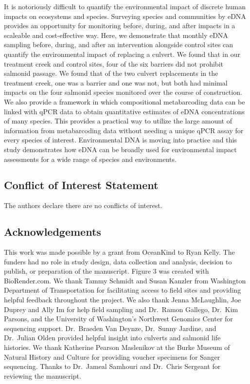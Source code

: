 \documentclass[
]{article}
\begin{document}
It is notoriously difficult to quantify the environmental impact of
discrete human impacts on ecosystems and species. Surveying species and
communities by eDNA provides an opportunity for monitoring before,
during, and after impacts in a scaleable and cost-effective way. Here,
we demonstrate that monthly eDNA sampling before, during, and after an
intervention alongside control sites can quantify the environmental
impact of replacing a culvert. We found that in our treatment creek and
control sites, four of the six barriers did not prohibit salmonid
passage. We found that of the two culvert replacements in the treatment
creek, one was a barrier and one was not, but both had minimal impacts
on the four salmonid species monitored over the course of construction.
We also provide a framework in which compositional metabarcoding data
can be linked with qPCR data to obtain quantitative estimates of eDNA
concentrations of many species. This provides a practical way to utilize
the large amount of information from metabarcoding data without needing
a unique qPCR assay for every species of interest. Environmental DNA is
moving into practice and this study demonstrates how eDNA can be broadly
used for environmental impact assessments for a wide range of species
and environments.

\hypertarget{conflict-of-interest-statement}{%
\subsection{Conflict of Interest
Statement}\label{conflict-of-interest-statement}}

The authors declare there are no conflicts of interest.

\hypertarget{acknowledgements}{%
\subsection{Acknowledgements}\label{acknowledgements}}

This work was made possible by a grant from OceanKind to Ryan Kelly. The
funders had no role in study design, data collection and analysis,
decision to publish, or preparation of the manuscript. Figure 3 was
created with BioRender.com. We thank Tammy Schmidt and Susan Kanzler
from Washington Department of Transportation for facilitating access to
field sites and providing helpful feedback throughout the project. We
also thank Jenna McLaughlin, Joe Duprey and Ally Im for help field
sampling and Dr.~Ramon Gallego, Dr.~Kim Parsons, and the University of
Washington's Northwest Genomics Center for sequencing support.
Dr.~Braeden Van Deynze, Dr.~Sunny Jardine, and Dr.~Julian Olden provided
helpful insight into culverts and salmonid life histories. We thank
Katherine Pearson Maslenikov at the Burke Museum of Natural History and
Culture for providing voucher specimens for Sanger sequencing. Thanks to
Dr.~Jameal Samhouri and Dr.~Chris Sergeant for reviewing the manuscript.
\end{document}

